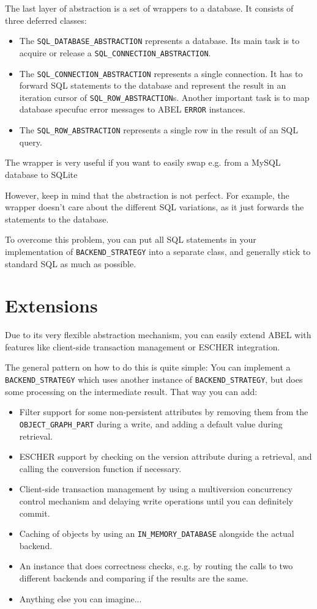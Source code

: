 The last layer of abstraction is a set of wrappers to a database. 
It consists of three deferred classes: 
\begin{itemize}
 \item The \lstinline!SQL_DATABASE_ABSTRACTION! represents a database. Its main task is to acquire or release a \lstinline!SQL_CONNECTION_ABSTRACTION!.
 \item The \lstinline!SQL_CONNECTION_ABSTRACTION! represents a single connection. 
It has to forward SQL statements to the database and represent the result in an iteration cursor of \lstinline!SQL_ROW_ABSTRACTION!s.
Another important task is to map database specufuc error messages to ABEL \lstinline!ERROR! instances.
  \item The \lstinline!SQL_ROW_ABSTRACTION! represents a single row in the result of an SQL query.
\end{itemize}

The wrapper is very useful if you want to easily swap e.g. from a MySQL database to SQLite

However, keep in mind that the abstraction is not perfect. 
For example, the wrapper doesn't care about the different SQL variations, as it just forwards the statements to the database.

To overcome this problem, you can put all SQL statements in your implementation of \lstinline!BACKEND_STRATEGY! into a separate class, and generally stick to standard SQL as much as possible.


\section{Extensions}

Due to its very flexible abstraction mechanism, you can easily extend ABEL with features like client-side transaction management or ESCHER \cite {escher} integration.

The general pattern on how to do this is quite simple: 
You can implement a \lstinline!BACKEND_STRATEGY! which uses another instance of \lstinline!BACKEND_STRATEGY!, but does some processing on the intermediate result.
That way you can add:

\begin{itemize}
 \item Filter support for some non-persistent attributes by removing them from the \lstinline!OBJECT_GRAPH_PART! during a write, and adding a default value during retrieval.
 \item ESCHER support by checking on the version attribute during a retrieval, and calling the conversion function if necessary.
 \item Client-side transaction management by using a multiversion concurrency control mechanism and delaying write operations until you can definitely commit.
 \item Caching of objects by using an \lstinline!IN_MEMORY_DATABASE! alongside the actual backend.
 \item An instance that does correctness checks, e.g. by routing the calls to two different backends and comparing if the results are the same.
 \item Anything else you can imagine...
\end{itemize}

